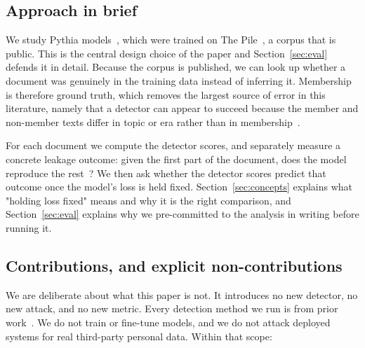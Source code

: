 \subsection{Approach in brief}
We study Pythia models~\citep{biderman2023pythia}, which were trained on The
Pile~\citep{gao2020pile}, a corpus that is public. This is the central design choice of
the paper and Section~\ref{sec:eval} defends it in detail. Because the corpus is
published, we can look up whether a document was genuinely in the training data instead
of inferring it. Membership is therefore ground truth, which removes the largest source
of error in this literature, namely that a detector can appear to succeed because the
member and non-member texts differ in topic or era rather than in
membership~\citep{duan2024mia}.

For each document we compute the detector scores, and separately measure a concrete
leakage outcome: given the first part of the document, does the model reproduce the
rest~\citep{carlini2023quantifying}? We then ask whether the detector scores predict
that outcome once the model's loss is held fixed. Section~\ref{sec:concepts} explains
what "holding loss fixed" means and why it is the right comparison, and
Section~\ref{sec:eval} explains why we pre-committed to the analysis in writing before
running it.

\subsection{Contributions, and explicit non-contributions}
We are deliberate about what this paper is not. It introduces no new detector, no new
attack, and no new metric. Every detection method we run is from prior
work~\citep{yeom2018privacy,shi2024detecting,zhang2025minkpp,carlini2021extracting,brown2020gpt3,oren2024proving}.
We do not train or fine-tune models, and we do not attack deployed systems for real
third-party personal data. Within that scope:

